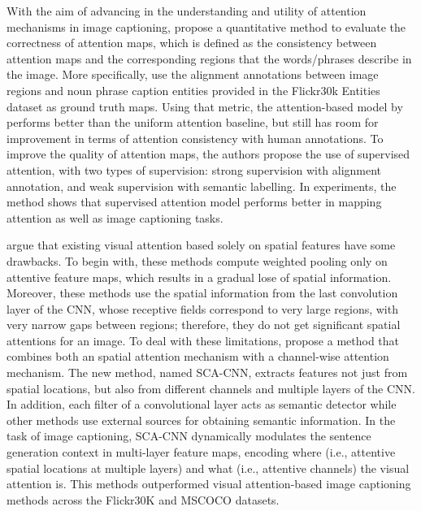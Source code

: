 With the aim of advancing in the understanding and utility of attention mechanisms in image captioning, \citet{Liu2017_SAM} propose a quantitative method to evaluate the correctness of attention maps, which is defined as the consistency between attention maps and the corresponding regions that the words/phrases describe in the image. More specifically, \citeauthor{Liu2017_SAM} use the alignment annotations between image regions and noun phrase caption entities provided in the Flickr30k Entities dataset \citep{Plummer2015} as  ground truth maps. Using that metric, the attention-based model by \citet{Xu2015} performs better than the uniform attention baseline, but still has room for improvement in terms of attention consistency with human annotations. To improve the quality of attention maps, the authors propose the use of supervised attention, with two types of supervision: strong supervision with alignment annotation, and weak supervision with semantic labelling. In experiments, the method shows that supervised attention model performs better in mapping attention as well as image captioning tasks.

\citet{Chen2017_SCA} argue that existing visual attention based solely on spatial features have some drawbacks. To begin with, these methods compute weighted pooling only on attentive feature maps, which results in a gradual lose of spatial information. Moreover, these methods use the spatial information from the last convolution layer of the CNN, whose receptive fields correspond to very large regions, with very narrow gaps between regions; therefore, they do not get significant spatial attentions for an image. To deal with these limitations, \citeauthor{Chen2017_SCA} propose a method that combines both an spatial attention mechanism with a channel-wise attention mechanism. The new method, named SCA-CNN, extracts features not just from spatial locations, but also from different channels and multiple layers of the CNN. In addition, each filter of a convolutional layer acts as semantic detector \citep{Zeiler2014} while other methods use external sources for obtaining semantic information. In the task of image captioning, SCA-CNN dynamically modulates the sentence generation context in multi-layer feature maps, encoding where (i.e., attentive spatial locations at multiple layers) and what (i.e., attentive channels) the visual attention is. This methods outperformed visual attention-based image captioning methods across the Flickr30K and MSCOCO datasets.

